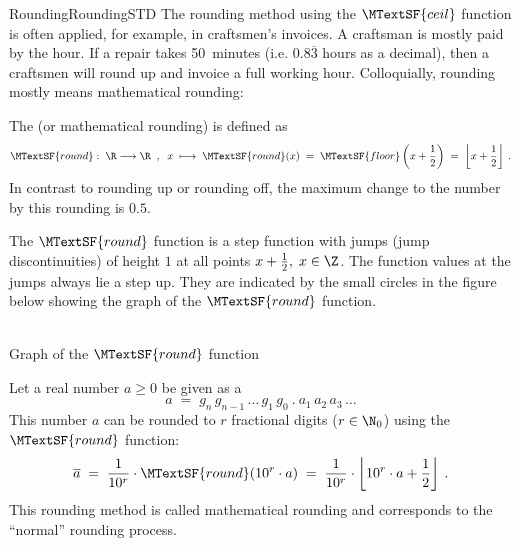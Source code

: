 \begin{MXContent}{Rounding}{Rounding}{STD}
The rounding method using the $\MTextSF{ceil}$ function is often applied, for example, in craftsmen's invoices. 
A craftsman is mostly paid by the hour. If a repair takes 50~minutes (i.e. $0.8\overline{3}$ hours as 
a decimal), then a craftsmen will round up and invoice a full working hour. Colloquially, rounding 
mostly means mathematical rounding:

\begin{MInfo}
The  (or mathematical rounding) is defined as
$$
\MTextSF{round}:\; \R\longrightarrow\R\;\; , \;\;
x\;\longmapsto\; \MTextSF{round}(x)\;=\; \MTextSF{floor}\left({x + \frac{1}{2}}\right) \; =\; \left\lfloor{ x + \frac{1}{2} }\right\rfloor\: .
$$
In contrast to rounding up or rounding off, the maximum change to the number by this rounding is $0.5$.
\end{MInfo}

The $\MTextSF{round}$ function is a step function with jumps (jump discontinuities) of height $1$ at all points $x+\frac{1}{2},\; x\in \Z$. The function values at the jumps always
lie a step up. They are indicated by the small circles in the figure below showing the graph of the $\MTextSF{round}$ function.

\begin{center}
\\
Graph of the $\MTextSF{round}$ function
\end{center}

Let a real number $a\geq 0$ be given as a 
$$
a \;=\; g_n\, g_{n-1}\, \ldots\, g_1\, g_0\: .\: a_1\,a_2\, a_3\, \ldots
$$
This number $a$ can be rounded to $r$ fractional digits ($r\in\N_0$) using the $\MTextSF{round}$ function:
$$
\overline{a}\; =\; \frac{1}{10^{r}}\cdot \MTextSF{round}(10^{r}\cdot a)\; =\; \frac{1}{10^{r}}\cdot \left\lfloor{ 10^{r}\cdot a + \frac{1}{2} }\right\rfloor\: .
$$
This rounding method is called mathematical rounding and corresponds to the ``normal'' rounding process.


\end{MXContent}
